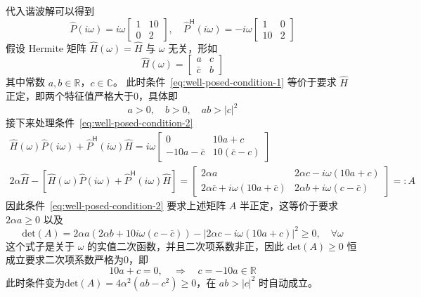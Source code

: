 \begin{solution*}
    代入谐波解可以得到
    \[
        \widehat{P}(i\omega)=i\omega \begin{bmatrix}
            1 & 10 \\
            0 & 2
        \end{bmatrix},\quad
        \widehat{P}^\mathsf{H}(i\omega)=-i\omega \begin{bmatrix}
            1  & 0 \\
            10 & 2
        \end{bmatrix}
    \]
    假设 Hermite 矩阵 $\widehat{H}(\omega) = \widehat{H}$ 与 $\omega$ 无关，形如
    \[
        \widehat{H}(\omega)=\begin{bmatrix}
            a       & c \\
            \bar{c} & b
        \end{bmatrix}
    \]
    其中常数 $a,b \in \mathbb{R}$，$c \in \mathbb{C}$。
    此时条件~\eqref{eq:well-posed-condition-1} 等价于要求 $\widehat{H}$ 正定，即两个特征值严格大于0，具体即
    \[
        a > 0,\quad b > 0,\quad a b > |c|^2
    \]
    接下来处理条件~\eqref{eq:well-posed-condition-2}
    \begin{gather*}
        \widehat{H}(\omega)\widehat{P}(i\omega)+\widehat{P}^\mathsf{H}(i\omega)\widehat{H}=
        i\omega \begin{bmatrix}
            0            & 10a+c         \\
            -10a-\bar{c} & 10(\bar{c}-c)
        \end{bmatrix} \\
        2 \alpha \widehat{H} - \left[\widehat{H}(\omega)\widehat{P}(i\omega)+\widehat{P}^\mathsf{H}(i\omega)\widehat{H}\right]
        = \begin{bmatrix}
            2 \alpha a                                   & 2 \alpha c - i \omega(10 a + c)     \\
            2 \alpha \bar{c} + i \omega (10 a + \bar{c}) & 2 \alpha b + i \omega (c - \bar{c})
        \end{bmatrix} =: A
    \end{gather*}
    因此条件~\eqref{eq:well-posed-condition-2} 要求上述矩阵 $A$ 半正定，这等价于要求 $2 \alpha a \ge 0$ 以及
    \[
        \text{det}(A) = 2 \alpha a(2 \alpha b + 10 i \omega(c - \bar{c}))
        - |2\alpha c - i \omega(10a + c)|^2 \ge 0,\quad \forall \omega
    \]
    这个式子是关于 $\omega$ 的实值二次函数，并且二次项系数非正，因此 $\text{det}(A) \ge 0$ 恒成立要求二次项系数严格为0，即
    \[
        10 a + c = 0, \quad \Rightarrow \quad c = -10 a \in \mathbb{R}
    \]
    此时条件变为$\text{det}(A) = 4 \alpha^2 (a b - c^2) \ge 0$，在 $ab > |c|^2$ 时自动成立。



\end{solution*}
